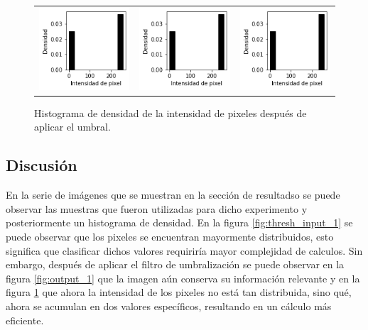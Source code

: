 \begin{figure}[!h]
\begin{tabular}{ccc}
        \includegraphics[width=4cm]{../Plots/THR/threshold_output_12.png} &
        \includegraphics[width=4cm]{../Plots/THR/threshold_output_13.png} &
        \includegraphics[width=4cm]{../Plots/THR/threshold_output_14.png} \\

    \end{tabular}        
    \caption{Histograma de densidad de la intensidad de pixeles después de aplicar el umbral.}
    \label{fig:thresh_out_1}
\end{figure}

\subsection{Discusión}
En la serie de imágenes que se muestran en la sección de resultadso se puede observar las muestras que fueron utilizadas para dicho experimento y posteriormente un histograma de densidad. En la figura \ref{fig:thresh_input_1} se puede observar que los pixeles se encuentran mayormente distribuidos, esto significa que clasificar dichos valores requiriría mayor complejidad de calculos. Sin embargo, después de aplicar el filtro de umbralización se puede observar en la figura \ref{fig:output_1} que la imagen aún conserva su información relevante y en la figura \ref{fig:thresh_out_1} que ahora la intensidad de los pixeles no está tan distribuida, sino qué, ahora se acumulan en dos valores específicos, resultando en un cálculo más eficiente.

